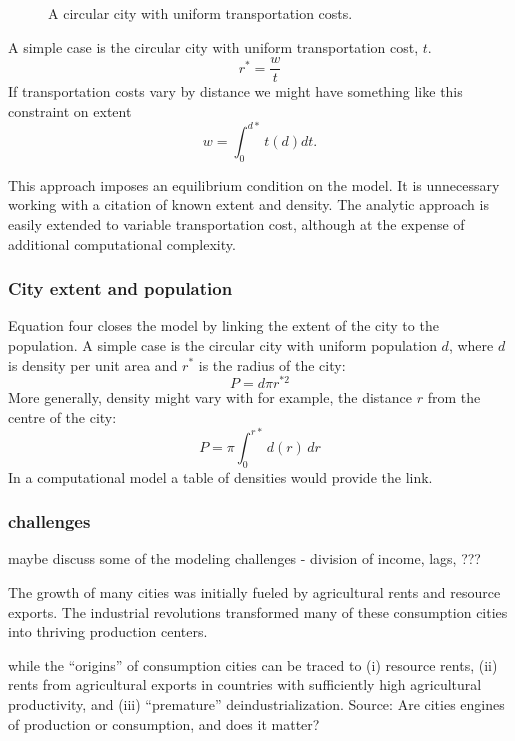 \begin{figure}
    \begin{center}
    
    \caption{A circular city with uniform transportation costs.}
    \label{fig-rent-alonzo}
    \end{center}
\end{figure}

A simple case is the circular city with uniform transportation cost, $t$. \[r^*= \frac{w}{t}\]%
If transportation costs vary by  distance we might have something like this constraint on extent\[w=\int_0^{d*} t(d)dt.\]

This approach imposes an equilibrium condition on the model. It is unnecessary working with a citation of known extent and density. The analytic approach is easily extended to variable transportation cost, although at the expense of additional computational complexity.

\subsubsection{City extent and population}
Equation  four  closes the model by linking the extent of the city to the population. A simple case is the circular city with uniform population $d$, where $d$ is density per unit area and $r^*$ is the radius of the city: \[P=d\pi r^{*2}\] 
More generally, density might vary with for example, the distance $r$ from the centre of the city:
\[P=\pi \int_{0}^{r*}d(r)\,dr\] 
In a computational model a table of densities would provide the link.



\subsubsection{challenges}
maybe discuss some of the modeling challenges - division of income, lags, ???

\vspace{2cm}

 The growth of many cities was initially fueled by agricultural rents and resource exports. The industrial revolutions transformed many of these consumption cities into thriving production centers. 

while the ``origins'' of consumption cities can be traced to (i)
resource rents, (ii) rents from agricultural exports in countries with sufficiently high agricultural productivity, and (iii) ``premature'' deindustrialization.  Source:
{Are cities engines of production or consumption, and does it matter?}




